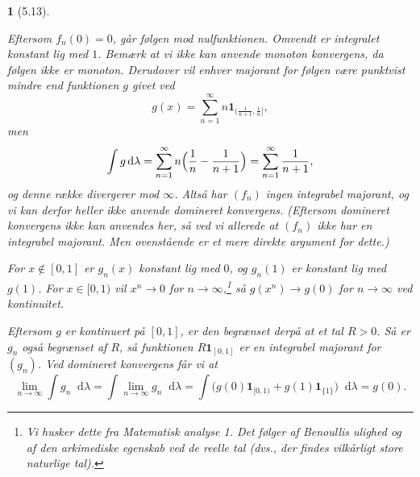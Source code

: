 \documentclass[a4paper, 11pt, article, danish, oneside]{memoir}
\newcommand{\dif}{\mathop{}\!\mathrm{d}}
\newcommand{\indicator}[1]{\mathbf{1}_{#1}}
\newcommand{\pencilsymbol}{\raisebox{-2pt}{\normalfont\PencilLeft}}
\theoremstyle{changedotcustomnumber}
\theoremstyle{changedotbreakcustomnumber}
\newtheorem{opgavebreak}{\pencilsymbol}
\begin{document}
\begin{opgavebreak}[5.13]
\begin{solutionsec}
    \item Eftersom $f_n(0) = 0$, går følgen mod nulfunktionen. Omvendt er integralet konstant lig med $1$. Bemærk at vi ikke kan anvende monoton konvergens, da følgen ikke er monoton. Derudover vil enhver majorant for følgen være punktvist mindre end funktionen $g$ givet ved
    \begin{equation*}
        g(x)
            = \sum_{n=1}^\infty n \indicator{\bigl(\tfrac{1}{n+1},\tfrac{1}{n}\bigr]},
    \end{equation*}
    men
    \begin{equation*}
        \int g \dif\lambda
            = \sum_{n=1}^\infty n \Bigl( \frac{1}{n} - \frac{1}{n+1} \Bigr)
            = \sum_{n=1}^\infty \frac{1}{n+1},
    \end{equation*}
    og denne række divergerer mod $\infty$. Altså har $(f_n)$ ingen integrabel majorant, og vi kan derfor heller ikke anvende domineret konvergens. (Eftersom domineret konvergens ikke kan anvendes her, så ved vi allerede at $(f_n)$ ikke har en integrabel majorant. Men ovenstående er et mere direkte argument for dette.)

    \item For $x \not\in [0,1]$ er $g_n(x)$ konstant lig med $0$, og $g_n(1)$ er konstant lig med $g(1)$. For $x \in [0,1)$ vil $x^n \to 0$ for $n \to \infty$,\footnote{Vi husker dette fra \emph{Matematisk analyse 1}. Det følger af Benoullis ulighed og af den arkimediske egenskab ved de reelle tal (dvs., der findes vilkårligt store naturlige tal).} så $g(x^n) \to g(0)$ for $n \to \infty$ ved kontinuitet.

    Eftersom $g$ er kontinuert på $[0,1]$, er den begrænset derpå at et tal $R > 0$. Så er $g_n$ også begrænset af $R$, så funktionen $R \indicator{[0,1]}$ er en integrabel majorant for $(g_n)$. Ved domineret konvergens får vi at
    \begin{equation*}
        \lim_{n \to \infty} \int g_n \dif\lambda
            = \int \lim_{n \to \infty} g_n \dif\lambda
            = \int \bigl( g(0) \indicator{[0,1)} + g(1) \indicator{\{1\}} \bigr) \dif\lambda
            = g(0).
    \end{equation*}
\end{solutionsec}
\end{opgavebreak}
\end{document}
